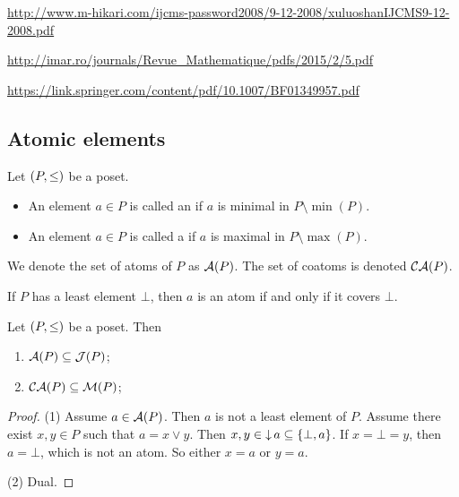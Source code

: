 \url{http://www.m-hikari.com/ijcms-password2008/9-12-2008/xuluoshanIJCMS9-12-2008.pdf}

\url{http://imar.ro/journals/Revue_Mathematique/pdfs/2015/2/5.pdf}

\url{https://link.springer.com/content/pdf/10.1007/BF01349957.pdf}


\subsection{Atomic elements}
\begin{definition}
Let $\sSet{P,\leq}$ be a poset.
\begin{itemize}
\item An element $a\in P$ is called an  if $a$ is minimal in $P\setminus\min(P)$.
\item An element $a\in P$ is called a  if $a$ is maximal in $P\setminus\max(P)$.
\end{itemize}
We denote the set of atoms of $P$ as $\operatorname{\mathcal{A}}(P)$. The set of coatoms is denoted $\operatorname{\mathcal{CA}}(P)$.
\end{definition}
If $P$ has a least element $\bot$, then $a$ is an atom if and only if it covers $\bot$.

\begin{lemma} \label{atomsJoinIrriducible}
Let $\sSet{P,\leq}$ be a poset. Then
\begin{enumerate}
\item $\operatorname{\mathcal{A}}(P) \subseteq \operatorname{\mathcal{J}}(P)$;
\item $\operatorname{\mathcal{CA}}(P) \subseteq \operatorname{\mathcal{M}}(P)$;
\end{enumerate}
\end{lemma}
\begin{proof}
(1) Assume $a\in \operatorname{\mathcal{A}}(P)$. Then $a$ is not a least element of $P$. Assume there exist $x,y\in P$ such that $a = x\vee y$. Then $x,y\in \operatorname{\downarrow} a \subseteq \{\bot, a\}$. If $x= \bot = y$, then $a = \bot$, which is not an atom. So either $x = a$ or $y = a$.

(2) Dual.
\end{proof}


